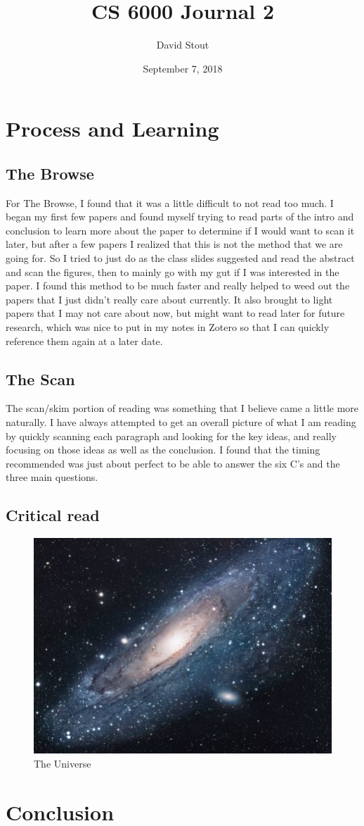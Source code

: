 \documentclass{IEEEtran}
\title{CS 6000 Journal 2}
\author{David Stout}
\date{September 7, 2018}
\begin{document}
\maketitle

\section{Process and Learning}
\subsection{The Browse}
For The Browse, I found that it was a little difficult to not read too much. I began my first few papers 
and found myself trying to read parts of the intro and conclusion to learn more about the paper to 
determine if I would want to scan it later, but after a few papers I realized that this is not the method 
that we are going for. So I tried to just do as the class slides suggested and read the abstract and scan 
the figures, then to mainly go with my gut if I was interested in the paper. I found this method to be much 
faster and really helped to weed out the papers that I just didn't really care about currently. It also 
brought to light papers that I may not care about now, but might want to read later for future research, 
which was nice to put in my notes in Zotero so that I can quickly reference them again at a later date.
\subsection{The Scan}
The scan/skim portion of reading was something that I believe came a little more naturally. I have always 
attempted to get an overall picture of what I am reading by quickly scanning each paragraph and looking for 
the key ideas, and really focusing on those ideas as well as the conclusion. I found that the timing 
recommended was just about perfect to be able to answer the six C's and the three main questions. 
\subsection{Critical read}

\begin{figure}[h!]
\centering
\includegraphics[scale=1.7]{universe}
\caption{The Universe}
\label{fig:universe}
\end{figure}

\section{Conclusion}


\nocite{*}



\end{document}
